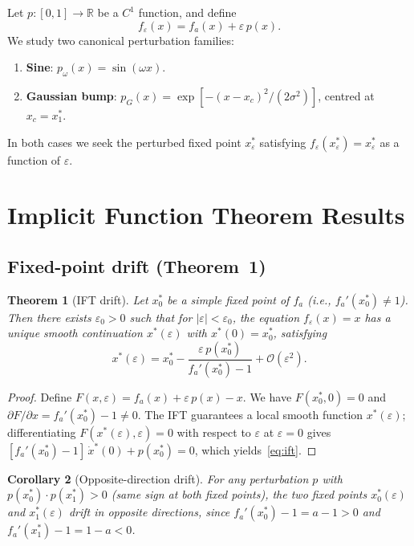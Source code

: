 \documentclass[aps,pre,twocolumn,superscriptaddress,nofootinbib,
               longbibliography,floatfix]{revtex4-2}
\newcommand{\eps}{\varepsilon}
\newcommand{\xsz}{x^*_0}
\newcommand{\xso}{x^*_1}
\newcommand{\bigO}[1]{\mathcal{O}(#1)}
\theoremstyle{plain}
\newtheorem{theorem}{Theorem}[section]
\newtheorem{corollary}[theorem]{Corollary}
\theoremstyle{remark}
\begin{document}
Let $p : [0,1] \to \mathbb{R}$ be a $C^1$ function, and define
%
\begin{equation}
  f_\eps(x) = f_a(x) + \eps\, p(x).
  \label{eq:feps}
\end{equation}
%
We study two canonical perturbation families:
%
\begin{enumerate}
  \item \textbf{Sine}: $p_\omega(x) = \sin(\omega x)$.
  \item \textbf{Gaussian bump}:
    $p_G(x) = \exp[-(x - x_c)^2/(2\sigma^2)]$,
    centred at $x_c = \xso$.
\end{enumerate}
%
In both cases we seek the perturbed fixed point
$x^*_\eps$ satisfying $f_\eps(x^*_\eps) = x^*_\eps$
as a function of $\eps$.

\section{Implicit Function Theorem Results}
\label{sec:ift}

\subsection{Fixed-point drift (Theorem~1)}

\begin{theorem}[IFT drift]
\label{thm:drift}
Let $x^*_0$ be a simple fixed point of $f_a$
(i.e., $f_a'(x^*_0) \neq 1$).
Then there exists $\eps_0 > 0$ such that for $|\eps| < \eps_0$,
the equation $f_\eps(x) = x$ has a unique smooth continuation
$x^*(\eps)$ with $x^*(0) = x^*_0$, satisfying
%
\begin{equation}
  x^*(\eps) = x^*_0
  - \frac{\eps\, p(x^*_0)}{f_a'(x^*_0) - 1}
  + \bigO{\eps^2}.
  \label{eq:ift}
\end{equation}
\end{theorem}
%
\begin{proof}
Define $F(x,\eps) = f_a(x) + \eps\, p(x) - x$.
We have $F(x^*_0, 0) = 0$ and
$\partial F/\partial x = f_a'(x^*_0) - 1 \neq 0$.
The IFT guarantees a local smooth function $x^*(\eps)$;
differentiating $F(x^*(\eps), \eps) = 0$ with respect to $\eps$
at $\eps = 0$ gives
$[f_a'(x^*_0)-1]\,\dot{x}^*(0) + p(x^*_0) = 0$,
which yields~\eqref{eq:ift}.
\end{proof}

\begin{corollary}[Opposite-direction drift]
\label{cor:opposite}
For any perturbation $p$ with $p(\xsz) \cdot p(\xso) > 0$
(same sign at both fixed points), the two fixed points
$\xsz(\eps)$ and $\xso(\eps)$ drift in opposite directions,
since $f_a'(\xsz) - 1 = a - 1 > 0$ and
$f_a'(\xso) - 1 = 1 - a < 0$.
\end{corollary}
\end{document}
